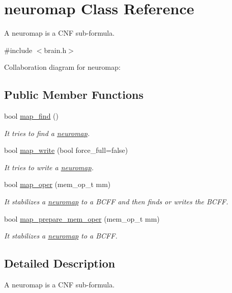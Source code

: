 \hypertarget{classneuromap}{}\section{neuromap Class Reference}
\label{classneuromap}


A neuromap is a C\+NF sub-\/formula.  




{\ttfamily \#include $<$brain.\+h$>$}



Collaboration diagram for neuromap\+:
\subsection*{Public Member Functions}
\begin{DoxyCompactItemize}
\item 
bool \hyperlink{classneuromap_a5da738c0ecb7ba74a4fc435ca33b1fcb}{map\+\_\+find} ()
\begin{DoxyCompactList}\small\item\em It tries to find a \hyperlink{classneuromap}{neuromap}. \end{DoxyCompactList}\item 
bool \hyperlink{classneuromap_adb0c3a4698866c919272f9b4ba5998fd}{map\+\_\+write} (bool force\+\_\+full=false)
\begin{DoxyCompactList}\small\item\em It tries to write a \hyperlink{classneuromap}{neuromap}. \end{DoxyCompactList}\item 
bool \hyperlink{classneuromap_a5ad7c9c245129fc8a162742c11d4e972}{map\+\_\+oper} (mem\+\_\+op\+\_\+t mm)
\begin{DoxyCompactList}\small\item\em It stabilizes a \hyperlink{classneuromap}{neuromap} to a B\+C\+FF and then finds or writes the B\+C\+FF. \end{DoxyCompactList}\item 
bool \hyperlink{classneuromap_a9c0e877474e2d17cf8b9da564de8b8c3}{map\+\_\+prepare\+\_\+mem\+\_\+oper} (mem\+\_\+op\+\_\+t mm)
\begin{DoxyCompactList}\small\item\em It stabilizes a \hyperlink{classneuromap}{neuromap} to a B\+C\+FF. \end{DoxyCompactList}\end{DoxyCompactItemize}


\subsection{Detailed Description}
A neuromap is a C\+NF sub-\/formula. 

